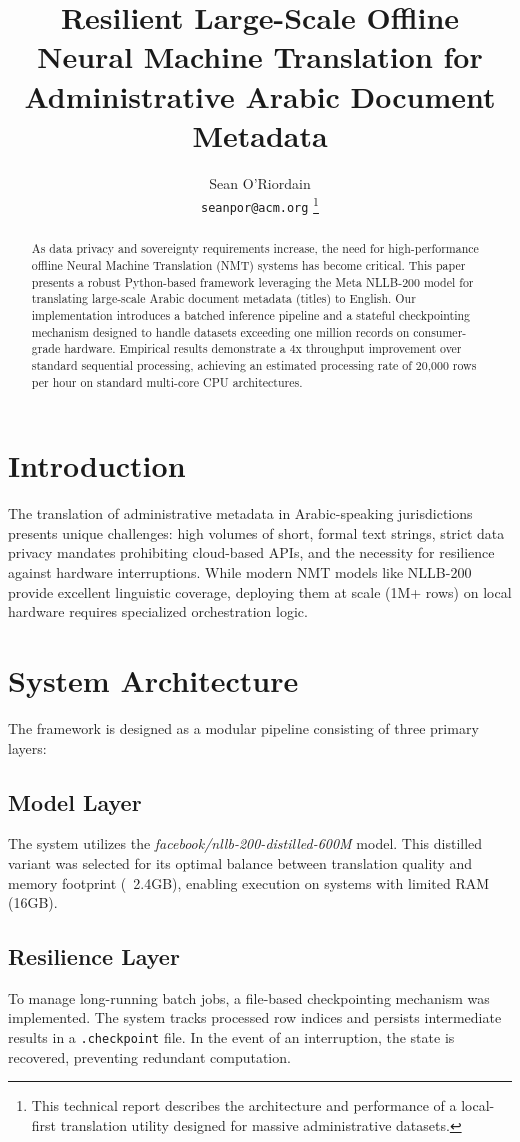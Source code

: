 \documentclass[10pt,twocolumn]{article}
\title{\textbf{Resilient Large-Scale Offline Neural Machine Translation for Administrative Arabic Document Metadata}}
\author{Sean O'Riordain \\
\texttt{seanpor@acm.org}
\thanks{This technical report describes the architecture and performance of a local-first translation utility designed for massive administrative datasets.}}
\date{}
\begin{document}
\maketitle

\begin{abstract}
As data privacy and sovereignty requirements increase, the need for high-performance offline Neural Machine Translation (NMT) systems has become critical. This paper presents a robust Python-based framework leveraging the Meta NLLB-200 model for translating large-scale Arabic document metadata (titles) to English. Our implementation introduces a batched inference pipeline and a stateful checkpointing mechanism designed to handle datasets exceeding one million records on consumer-grade hardware. Empirical results demonstrate a 4x throughput improvement over standard sequential processing, achieving an estimated processing rate of 20,000 rows per hour on standard multi-core CPU architectures.
\end{abstract}

\section{Introduction}
The translation of administrative metadata in Arabic-speaking jurisdictions presents unique challenges: high volumes of short, formal text strings, strict data privacy mandates prohibiting cloud-based APIs, and the necessity for resilience against hardware interruptions. While modern NMT models like NLLB-200 provide excellent linguistic coverage, deploying them at scale (1M+ rows) on local hardware requires specialized orchestration logic.

\section{System Architecture}
The framework is designed as a modular pipeline consisting of three primary layers:

\subsection{Model Layer}
The system utilizes the \textit{facebook/nllb-200-distilled-600M} model. This distilled variant was selected for its optimal balance between translation quality and memory footprint (~2.4GB), enabling execution on systems with limited RAM (16GB).

\subsection{Resilience Layer}
To manage long-running batch jobs, a file-based checkpointing mechanism was implemented. The system tracks processed row indices and persists intermediate results in a \texttt{.checkpoint} file. In the event of an interruption, the state is recovered, preventing redundant computation.
\end{document}
